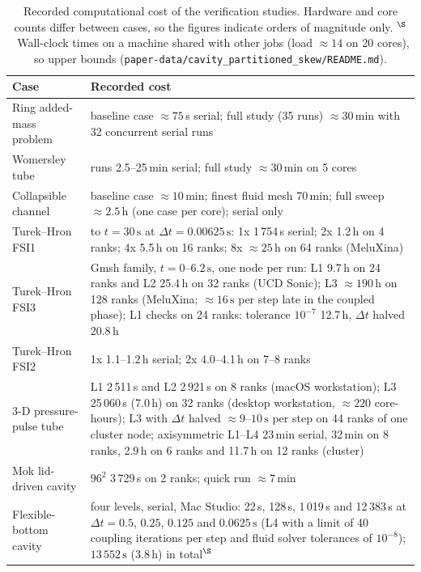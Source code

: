 \begin{table}[htbp]
	\centering
	\footnotesize
	\setlength{\tabcolsep}{3pt}
	\caption{Recorded computational cost of the verification studies. Hardware and core counts differ between cases, so the figures indicate orders of magnitude only. $^\S$~Wall-clock times on a machine shared with other jobs (load $\approx14$ on 20 cores), so upper bounds (\texttt{paper-data/cavity\_partitioned\_skew/README.md}).}
	\label{tab:cost}
	\begin{tabular}{p{3.0cm}p{10.8cm}}
		\toprule
		Case & Recorded cost \\
		\midrule
		Ring added-mass problem & baseline case $\approx75$\,s serial; full study (35 runs) $\approx30$\,min with 32 concurrent serial runs \\
		Womersley tube & runs 2.5--25\,min serial; full study $\approx30$\,min on 5 cores \\
		Collapsible channel & baseline case $\approx10$\,min; finest fluid mesh 70\,min; full sweep $\approx2.5$\,h (one case per core); serial only \\
		Turek--Hron FSI1 & to $t = 30\,\mathrm{s}$ at $\Delta t = 0.00625\,\mathrm{s}$: 1x 1\,754\,s serial; 2x 1.2\,h on 4 ranks; 4x 5.5\,h on 16 ranks; 8x $\approx25$\,h on 64 ranks (MeluXina) \\
		Turek--Hron FSI3 & Gmsh family, $t = 0$--$6.2\,\mathrm{s}$, one node per run: L1 9.7\,h on 24 ranks and L2 25.4\,h on 32 ranks (UCD Sonic); L3 $\approx190$\,h on 128 ranks (MeluXina; $\approx16\,\mathrm{s}$ per step late in the coupled phase); L1 checks on 24 ranks: tolerance $10^{-7}$ 12.7\,h, $\Delta t$ halved 20.8\,h \\
		Turek--Hron FSI2 & 1x 1.1--1.2\,h serial; 2x 4.0--4.1\,h on 7--8 ranks \\
		3-D pressure-pulse tube & L1 2\,511\,s and L2 2\,921\,s on 8 ranks (macOS workstation); L3 25\,060\,s (7.0\,h) on 32 ranks (desktop workstation, $\approx220$ core-hours); L3 with $\Delta t$ halved $\approx9$--$10\,\mathrm{s}$ per step on 44 ranks of one cluster node; axisymmetric L1--L4 23\,min serial, 32\,min on 8 ranks, 2.9\,h on 6 ranks and 11.7\,h on 12 ranks (cluster) \\
		Mok lid-driven cavity & $96^2$ 3\,729\,s on 2 ranks; quick run $\approx7$\,min \\
		Flexible-bottom cavity & four levels, serial, Mac Studio: 22\,s, 128\,s, 1\,019\,s and 12\,383\,s at $\Delta t = 0.5$, $0.25$, $0.125$ and $0.0625\,\mathrm{s}$ (L4 with a limit of 40 coupling iterations per step and fluid solver tolerances of $10^{-8}$); $13\,552\,\mathrm{s}$ ($3.8$\,h) in total$^\S$ \\

\end{tabular}
\end{table}
